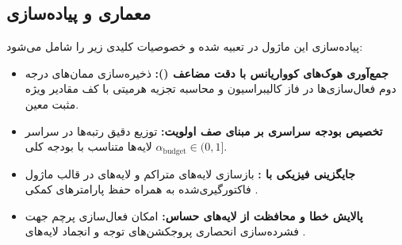 \subsection{معماری و پیاده‌سازی}
پیاده‌سازی این ماژول در  تعبیه شده و خصوصیات کلیدی زیر را شامل می‌شود:
\begin{itemize}
    \item \textbf{جمع‌آوری هوک‌های کوواریانس با دقت مضاعف ():} ذخیره‌سازی ممان‌های درجه دوم فعال‌سازی‌ها در فاز کالیبراسیون و محاسبه تجزیه هرمیتی  با کف مقادیر ویژه مثبت معین.
    \item \textbf{تخصیص بودجه سراسری بر مبنای صف اولویت:} توزیع دقیق رتبه‌ها در سراسر لایه‌ها متناسب با بودجه کلی $\alpha_{\text{budget}} \in (0, 1]$.
    \item \textbf{جایگزینی فیزیکی با :} بازسازی لایه‌های متراکم و لایه‌های  در قالب ماژول فاکتورگیری‌شده به همراه حفظ پارامترهای کمکی .
    \item \textbf{پالایش خطا و محافظت از لایه‌های حساس:} امکان فعال‌سازی پرچم  جهت فشرده‌سازی انحصاری پروجکشن‌های توجه و انجماد لایه‌های .
\end{itemize}
